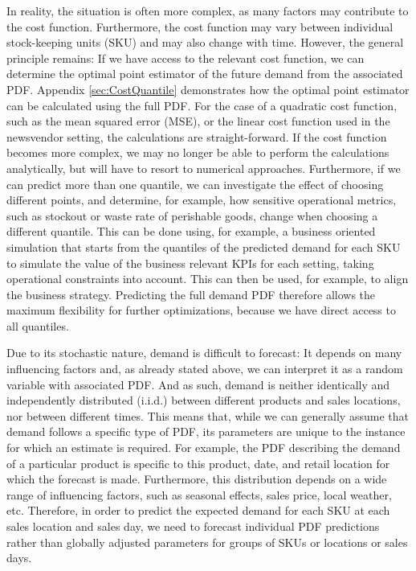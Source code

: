 \documentclass[BCOR=1mm, DIV=calc,10pt,
twoside=true,
twocolumn,
headings=normal]{scrartcl}
\begin{document}
In reality, the situation is often more complex, as many factors may contribute to the cost function. Furthermore, the cost function may vary between individual stock-keeping units (SKU) and may also change with time. However, the general principle remains: If we have access to the relevant cost function, we can determine the optimal point estimator of the future demand from the associated PDF. Appendix \ref{sec:CostQuantile} demonstrates how the optimal point estimator can be calculated using the full PDF. For the case of a quadratic cost function, such as the mean squared error (MSE), or the linear cost function used in the newsvendor setting, the calculations are straight-forward. If the cost function becomes more complex, we may no longer be able to perform the calculations analytically, but will have to resort to numerical approaches. Furthermore, if we can predict more than one quantile, we can investigate the effect of choosing different points, and determine, for example, how sensitive operational metrics, such as stockout or waste rate of perishable goods, change when choosing a different quantile. This can be done using, for example, a business oriented simulation that starts from the quantiles of the predicted demand for each SKU to simulate the value of the business relevant KPIs for each setting, taking operational constraints into account. This can then be used, for example, to align the business strategy. Predicting the full demand PDF therefore allows the maximum flexibility for further optimizations, because we have direct access to all quantiles.

Due to its stochastic nature, demand is difficult to forecast: It depends on many influencing factors and, as already stated above, we can interpret it as a random variable with associated PDF. And as such, demand is neither identically and independently distributed (i.i.d.) between different products and sales locations, nor between different times. This means that, while we can generally assume that demand follows a specific type of PDF, its parameters are unique to the instance for which an estimate is required. For example, the PDF describing the demand of a particular product is specific to this product, date, and retail location for which the forecast is made. Furthermore, this distribution depends on a wide range of influencing factors, such as seasonal effects, sales price, local weather, etc. Therefore, in order to predict the expected demand for each SKU at each sales location and sales day, we need to forecast individual PDF predictions rather than globally adjusted parameters for groups of SKUs or locations or sales days.
\end{document}
